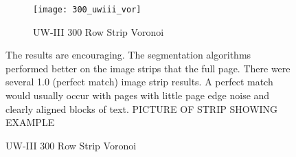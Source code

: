 \documentclass[conference]{IEEEtran}
\begin{document}
\begin{figure}[table-weights]
\begin{figure}[300_uwiii-vor]
\texttt{[image: 300\_uwiii\_vor]}
\caption{UW-III 300 Row Strip Voronoi}
\label{fig:300-uwiii-vor}
\end{figure}


The results are encouraging. The segmentation algorithms performed better on
the image strips that the full page. There were several 1.0 (perfect match)
image strip results. A perfect match would usually occur with pages with
little page edge noise and clearly aligned blocks of text.  
PICTURE OF STRIP SHOWING EXAMPLE


%
%



%
%



\end{figure}
\end{document}
